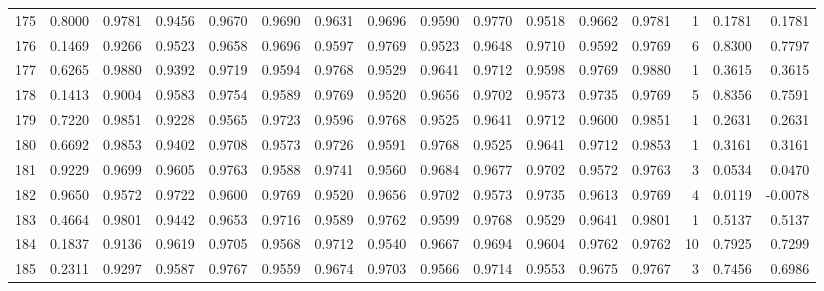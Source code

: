 \begin{tabular}{lrrrrrrrrrrrrrrr}
175 &      0.8000 &  0.9781 &  0.9456 &  0.9670 &  0.9690 &  0.9631 &  0.9696 &  0.9590 &  0.9770 &  0.9518 &   0.9662 &     0.9781 &      1 &                    0.1781 &                     0.1781 \\
176 &      0.1469 &  0.9266 &  0.9523 &  0.9658 &  0.9696 &  0.9597 &  0.9769 &  0.9523 &  0.9648 &  0.9710 &   0.9592 &     0.9769 &      6 &                    0.8300 &                     0.7797 \\
177 &      0.6265 &  0.9880 &  0.9392 &  0.9719 &  0.9594 &  0.9768 &  0.9529 &  0.9641 &  0.9712 &  0.9598 &   0.9769 &     0.9880 &      1 &                    0.3615 &                     0.3615 \\
178 &      0.1413 &  0.9004 &  0.9583 &  0.9754 &  0.9589 &  0.9769 &  0.9520 &  0.9656 &  0.9702 &  0.9573 &   0.9735 &     0.9769 &      5 &                    0.8356 &                     0.7591 \\
179 &      0.7220 &  0.9851 &  0.9228 &  0.9565 &  0.9723 &  0.9596 &  0.9768 &  0.9525 &  0.9641 &  0.9712 &   0.9600 &     0.9851 &      1 &                    0.2631 &                     0.2631 \\
180 &      0.6692 &  0.9853 &  0.9402 &  0.9708 &  0.9573 &  0.9726 &  0.9591 &  0.9768 &  0.9525 &  0.9641 &   0.9712 &     0.9853 &      1 &                    0.3161 &                     0.3161 \\
181 &      0.9229 &  0.9699 &  0.9605 &  0.9763 &  0.9588 &  0.9741 &  0.9560 &  0.9684 &  0.9677 &  0.9702 &   0.9572 &     0.9763 &      3 &                    0.0534 &                     0.0470 \\
182 &      0.9650 &  0.9572 &  0.9722 &  0.9600 &  0.9769 &  0.9520 &  0.9656 &  0.9702 &  0.9573 &  0.9735 &   0.9613 &     0.9769 &      4 &                    0.0119 &                    -0.0078 \\
183 &      0.4664 &  0.9801 &  0.9442 &  0.9653 &  0.9716 &  0.9589 &  0.9762 &  0.9599 &  0.9768 &  0.9529 &   0.9641 &     0.9801 &      1 &                    0.5137 &                     0.5137 \\
184 &      0.1837 &  0.9136 &  0.9619 &  0.9705 &  0.9568 &  0.9712 &  0.9540 &  0.9667 &  0.9694 &  0.9604 &   0.9762 &     0.9762 &     10 &                    0.7925 &                     0.7299 \\
185 &      0.2311 &  0.9297 &  0.9587 &  0.9767 &  0.9559 &  0.9674 &  0.9703 &  0.9566 &  0.9714 &  0.9553 &   0.9675 &     0.9767 &      3 &                    0.7456 &                     0.6986 \\

\end{tabular}
